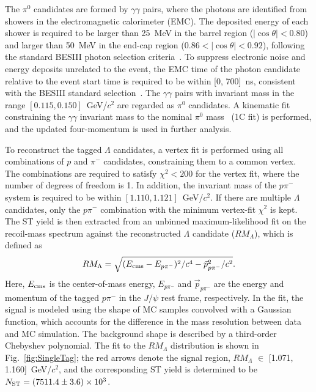\documentclass[prd,aps,reprint,noeprint,superscriptaddress,amsmath, amssymb]{revtex4-1}
\begin{document}
The $\pi^0$ candidates are formed by $\gamma\gamma$ pairs, where the photons are identified from showers in the electromagnetic calorimeter (EMC).
The deposited energy of each shower is required to be larger than 25~MeV in the barrel region ($|\cos\theta| < 0.80$) and larger than 50~MeV in the end-cap region ($0.86 < |\cos\theta| < 0.92$), following the standard BESIII photon selection criteria~\cite{BESIII:2023edk, BESIII:2021rqk}.
To suppress electronic noise and energy deposits unrelated to the event, the EMC time of the photon candidate relative to the event start time is required to be within [0, 700]~ns, consistent with the BESIII standard selection~\cite{BESIII:2023edk, BESIII:2021rqk}.
The $\gamma\gamma$ pairs with invariant mass in the range $[0.115, 0.150]$~GeV/$c^2$ are regarded as $\pi^0$ candidates.
A kinematic fit constraining the $\gamma\gamma$ invariant mass to the nominal $\pi^0$ mass~\cite{PDG} (1C fit) is performed, and the updated four-momentum is used in further analysis.

To reconstruct the tagged $\Lambda$ candidates, a vertex fit is performed using all combinations of $p$ and $\pi^-$ candidates, constraining them to a common vertex. The combinations are required to satisfy $\chi^2 < 200$ for the vertex fit, where the number of degrees of freedom is 1. In addition, the invariant mass of the $p\pi^-$ system is required to be within $[1.110, 1.121]$~GeV/$c^2$.
If there are multiple $\Lambda$ candidates, only the $p \pi^-$ combination with the minimum vertex-fit $\chi^2$ is kept.
The ST yield is then extracted from an unbinned maximum-likelihood fit
on the recoil-mass spectrum against the reconstructed $\Lambda$ candidate ($RM_{\Lambda}$),
which is defined as
\begin{equation}
    RM_{\Lambda} =
    \sqrt{(E_{\rm cms}-E_{p \pi^-})^2/c^4 - \vec{p}_{p\pi^-}^2/c^2}.
    \label{Eq:mRec}
\end{equation}
Here, $E_{\rm cms}$ is the center-of-mass energy, $E_{p \pi^-}$ and $\vec{p}_{p \pi^-}$
are the energy and momentum of the tagged $p \pi^-$ in the $J/\psi$ rest frame, respectively.
In the fit, the signal is modeled using the shape of  MC samples convolved with a Gaussian function,
which accounts for the difference
in the mass resolution between data and MC simulation.
The background shape is described by a third-order Chebyshev polynomial.
The fit to the $RM_{\Lambda}$ distribution is shown in Fig.~\ref{fig:SingleTag};
the red arrows denote the signal region, $RM_{\Lambda}$ $\in$ [1.071, 1.160]~GeV/$c^2$,
and the corresponding ST yield is determined to be $N_{\rm ST} = (7511.4 \pm 3.6) \times 10^{3}$.
\end{document}

